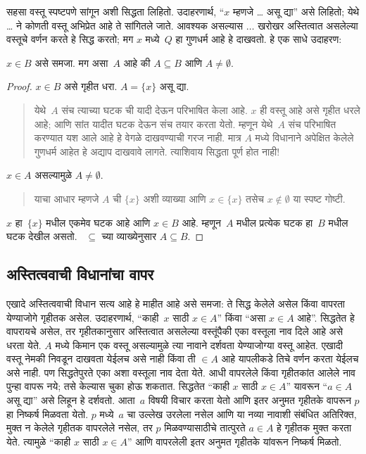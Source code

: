सहसा वस्तू स्पष्टपणे सांगून अशी सिद्धता लिहितो. उदाहरणार्थ, “$x$ म्हणजे \dots{} असू द्या” असे लिहितो; येथे \dots{} ने कोणती वस्तू अभिप्रेत आहे ते सांगितले जाते. आवश्यक असल्यास $\dots$ खरोखर अस्तित्वात असलेल्या वस्तूचे वर्णन करते हे सिद्ध करतो; मग $x$ मध्ये~$Q$ हा गुणधर्म आहे हे दाखवतो. हे एक साधे उदाहरण:

\begin{prop}
$x \in B$ असे समजा. मग असा~$A$ आहे की $A \subseteq B$ आणि $A \neq \emptyset$.
\end{prop}

\begin{proof}
$x \in B$ असे गृहीत धरा. $A = \{x\}$ असू द्या.
\begin{quote}
येथे~$A$ संच त्याच्या घटक ची यादी देऊन परिभाषित केला आहे. $x$ ही वस्तू आहे असे गृहीत धरले आहे; आणि सांत यादीत घटक देऊन संच तयार करता येतो. म्हणून येथे~$A$ संच परिभाषित करण्यात यश आले आहे हे वेगळे दाखवण्याची गरज नाही. मात्र $A$ मध्ये विधानाने अपेक्षित केलेले गुणधर्म आहेत हे अद्याप दाखवावे लागते. त्याशिवाय सिद्धता पूर्ण होत नाही!{}
\end{quote}
$x \in A$ असल्यामुळे $A \neq \emptyset$.
\begin{quote}
याचा आधार म्हणजे $A$ ची $\{x\}$ अशी व्याख्या आणि $x \in \{x\}$ तसेच $x \notin \emptyset$ या स्पष्ट गोष्टी.
\end{quote}
$x$ हा~$\{x\}$ मधील एकमेव घटक आहे आणि $x \in B$ आहे. म्हणून~$A$ मधील प्रत्येक घटक हा~$B$ मधील घटक देखील असतो. ~$ \subseteq$ च्या व्याख्येनुसार $A \subseteq B$.
\end{proof}

\subsection{अस्तित्ववाची विधानांचा वापर}

एखादे अस्तित्ववाची विधान सत्य आहे हे माहीत आहे असे समजा: ते सिद्ध केलेले असेल किंवा वापरता येण्याजोगे गृहीतक असेल. उदाहरणार्थ, “काही~$x$ साठी $x \in A$” किंवा “असा $x \in A$ आहे”. सिद्धतेत हे वापरायचे असेल, तर गृहीतकानुसार अस्तित्वात असलेल्या वस्तूंपैकी एका वस्तूला नाव दिले आहे असे धरता येते. $A$ मध्ये किमान एक वस्तू असल्यामुळे त्या नावाने दर्शवता येण्याजोग्या वस्तू आहेत. एखादी वस्तू नेमकी निवडून दाखवता येईलच असे नाही किंवा ती $\in A$ आहे यापलीकडे तिचे वर्णन करता येईलच असे नाही. पण सिद्धतेपुरते एका अशा वस्तूला नाव देता येते. आधी वापरलेले किंवा गृहीतकांत आलेले नाव पुन्हा वापरू नये; तसे केल्यास चुका होऊ शकतात. सिद्धतेत “काही $x$ साठी $x \in A$” यावरून “$a \in A$ असू द्या” असे लिहून हे दर्शवतो. आता~$a$ विषयी विचार करता येतो आणि इतर अनुमत गृहीतके वापरून $p$ हा निष्कर्ष मिळवता येतो. $p$ मध्ये~$a$ चा उल्लेख उरलेला नसेल आणि या नव्या नावाशी संबंधित अतिरिक्त, मुक्त न केलेले गृहीतक वापरलेले नसेल, तर $p$ मिळवण्यासाठीचे तात्पुरते $a \in A$ हे गृहीतक मुक्त करता येते. त्यामुळे “काही $x$ साठी $x \in A$” आणि वापरलेली इतर अनुमत गृहीतके यांवरून निष्कर्ष मिळतो.

